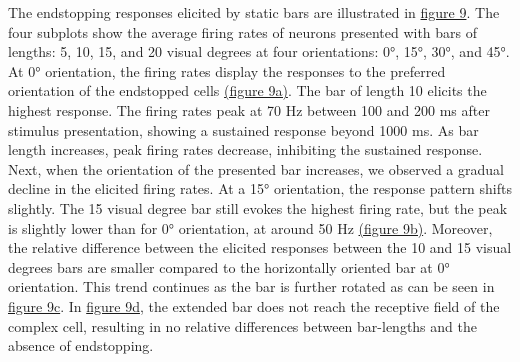 \documentclass[12pt]{article}
\begin{document}
The endstopping responses elicited by static bars are illustrated in \hyperref[fig:endstopping]{figure 9}. The four subplots show the average firing rates of neurons presented with bars of lengths: 5, 10, 15, and 20 visual degrees at four orientations: 0°, 15°, 30°, and 45°. At 0° orientation, the firing rates display the responses to the preferred orientation of the endstopped cells \hyperref[fig:endstopping]{(figure 9a)}. The bar of length 10 elicits the highest response. The firing rates peak at 70 Hz between 100 and 200 ms after stimulus presentation, showing a sustained response beyond 1000 ms. As bar length increases, peak firing rates decrease, inhibiting the sustained response. Next, when the orientation of the presented bar increases, we observed a gradual decline in the elicited firing rates. At a 15° orientation, the response pattern shifts slightly. The 15 visual degree bar still evokes the highest firing rate, but the peak is slightly lower than for 0° orientation, at around 50 Hz \hyperref[fig:endstopping]{(figure 9b)}. Moreover, the relative difference between the elicited responses between the 10 and 15 visual degrees bars are smaller compared to the horizontally oriented bar at 0° orientation. This trend continues as the bar is further rotated as can be seen in \hyperref[fig:endstopping]{figure 9c}. In \hyperref[fig:endstopping]{figure 9d}, the extended bar does not reach the receptive field of the complex cell, resulting in no relative differences between bar-lengths and the absence of endstopping. 
\end{document}
